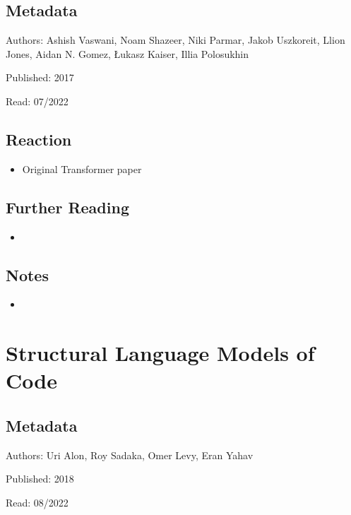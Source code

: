 \documentclass{article}
\begin{document}
\subsection*{Metadata}

\noindent Authors: Ashish Vaswani, Noam Shazeer, Niki Parmar, Jakob Uszkoreit, Llion Jones, Aidan N. Gomez, Łukasz Kaiser, Illia Polosukhin

\noindent Published: 2017

\noindent Read: 07/2022

\subsection*{Reaction}
\begin{itemize}
\item Original Transformer paper
\end{itemize}

\subsection*{Further Reading}
\begin{itemize}
	\item
\end{itemize}

\subsection*{Notes}

\begin{itemize}
	\item
\end{itemize}

\pagebreak


\section*{Structural Language Models of Code}

\subsection*{Metadata}

\noindent Authors: Uri Alon, Roy Sadaka, Omer Levy, Eran Yahav

\noindent Published: 2018

\noindent Read: 08/2022
\end{document}

